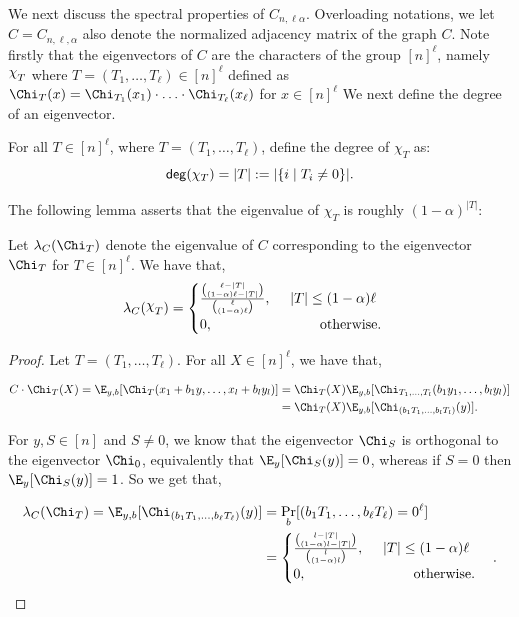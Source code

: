 We next discuss the spectral properties of $C_{n,\ell\alpha}$. Overloading notations, we let $C = C_{n,\ell,\alpha}$ also denote the normalized adjacency matrix of the graph $C$. Note firstly that the eigenvectors of $C$ are the characters of the group $[n]^\ell$, namely $\raisebox{2pt}{$\chi$}_{T}$ where $T = (T_1,\ldots,T_\ell) \in [n]^{\ell}$ defined as $\Chi_T(x) = \Chi_{T_1}(x_1) \cdot \ldots \cdot \Chi_{T_{\ell}}(x_\ell)$ for $x\in [n]^{\ell}$ 
We next define the degree of an eigenvector.

\begin{definition}
For all $T \in [n]^\ell$, where $T = (T_1,\ldots,T_\ell)$, define the degree of $\chi_{T}$ as:
$${\sf deg}(\chi_T) = |T| := |\{i \mid T_i \neq 0\}|.$$
\end{definition}

The following lemma asserts that the eigenvalue of $\chi_T$ is roughly $(1-\alpha)^{|T|}$:
\begin{lemma}\label{lem:eigenval}
Let $\lambda_C(\Chi_T)$ denote the eigenvalue of $C$ corresponding to the eigenvector $\Chi_T$ for $T \in [n]^\ell$. We have that, 
$$
\lambda_{C}(\raisebox{2pt}{$\chi$}_T) = 
\begin{cases}
\frac{\binom{\ell - |T|}{(1 - \alpha)\ell - |T|}}{\binom{\ell}{(1 - \alpha)\ell}}, ~~~~|T| \leq (1 - \alpha)\ell\\
0, ~~~~~~~~~~~~~~~~~~~~~~~\text{otherwise.} 
\end{cases}
$$
\end{lemma}

\begin{proof}
Let $T = (T_1, \ldots, T_\ell)$. For all $X \in [n]^\ell$, we have that,

\begin{align*}
C \cdot \Chi_T(X) = \E_{y,b}[\Chi_T(x_1+b_1 y, \ldots, x_l + b_l y_l)] 
&= \Chi_T(X) \E_{y,b}[\Chi_{T_1,\ldots,T_l}(b_1y_1,\ldots,b_ly_l)] \\
&= \Chi_T(X) \E_{y,b}[\Chi_{(b_1 T_1,\ldots,b_l T_l)}(y)].
\end{align*}

For $y,S \in [n]$ and $S \neq 0$, we know that the eigenvector $\Chi_S$ is orthogonal to the eigenvector $\Chi_0$, equivalently that $\E_y[\Chi_S(y)] = 0$, whereas if $S = 0$ then $\E_y[\Chi_S(y)] = 1$. So we get that,

\begin{align*}
\lambda_{C}(\Chi_T) = \E_{y,b}[\Chi_{(b_1 T_1,\ldots,b_\ell T_\ell)}(y)] 
&= \Pr_b[(b_1T_1,\ldots,b_\ell T_\ell) = 0^{\ell}] \\
&= \begin{cases}
\frac{\binom{l - |T|}{(1 - \alpha)l - |T|}}{\binom{l}{(1 - \alpha)l}}, ~~~~|T| \leq (1 - \alpha)\ell\\
0, ~~~~~~~~~~~~~~~~~~~~~~~\text{otherwise.} 
\end{cases}.
\end{align*}
\end{proof}

